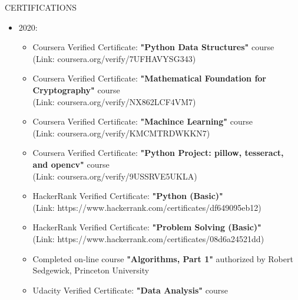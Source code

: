 \documentclass{resume} %
\begin{document}
\begin{rSection}{CERTIFICATIONS}
	\begin{itemize}
		\item {2020:}
		\begin{itemize}
			
			\item Coursera Verified Certificate: \textbf{"Python Data Structures"} course \\ (Link: coursera.org/verify/7UFHAVYSG343)
			
			\item Coursera Verified Certificate: \textbf{"Mathematical Foundation for Cryptography"} course \\ (Link: coursera.org/verify/NX862LCF4VM7)
			
			\item Coursera Verified Certificate: \textbf{"Machince Learning"} course \\ (Link: coursera.org/verify/KMCMTRDWKKN7)
			
			
			
			\item Coursera Verified Certificate: \textbf{"Python Project: pillow, tesseract, and opencv"} course \\ (Link: coursera.org/verify/9USSRVE5UKLA)
			
			
			
			\item HackerRank Verified Certificate: \textbf{"Python (Basic)"} \\ (Link: https://www.hackerrank.com/certificates/df649095eb12)
			
			\item HackerRank Verified Certificate: \textbf{"Problem Solving (Basic)"} \\ (Link: https://www.hackerrank.com/certificates/08d6a24521dd)
			
			\item Completed on-line course \textbf{"Algorithms, Part 1"} authorized by Robert Sedgewick, Princeton University
			
			\item Udacity Verified Certificate: \textbf{"Data Analysis"} course
		\end{itemize}
		
		
	\end{itemize}
\end{rSection}
\end{document}
